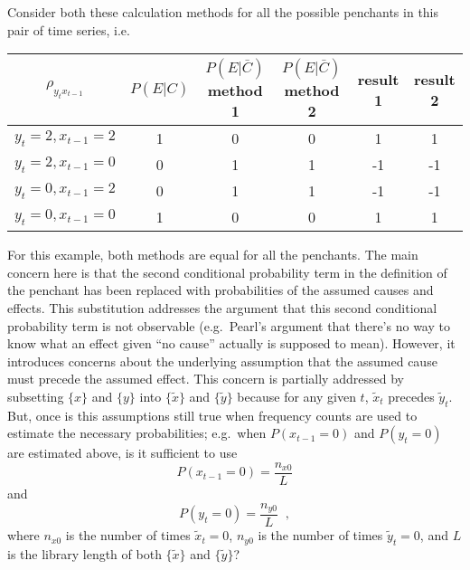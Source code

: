 \documentclass[a4paper,11pt]{article}
\begin{document}
Consider both these calculation methods for all the possible penchants in this pair of time series, i.e.\
\begin{center}
\begin{tabular}{c|c|c|c|c|c}
$\rho_{y_{t}x_{t-1}}$ & $P(E|C)$ & $P(E|\bar{C})$ method 1 & $P(E|\bar{C})$ method 2 & result 1 & result 2\\
\hline
 $y_{t}=2,x_{t-1}=2$& 1 & 0 & 0 & 1 & 1\\
 $y_{t}=2,x_{t-1}=0$& 0 & 1 & 1 & -1 & -1\\
 $y_{t}=0,x_{t-1}=2$& 0 & 1 & 1 & -1 & -1\\
 $y_{t}=0,x_{t-1}=0$& 1 & 0 & 0 & 1 & 1
\end{tabular}
\end{center}
For this example, both methods are equal for all the penchants.  The main concern here is that the second conditional probability term in the definition of the penchant has been replaced with probabilities of the assumed causes and effects.  This substitution addresses the argument that this second conditional probability term is not observable (e.g.\ Pearl's argument that there's no way to know what an effect given ``no cause'' actually is supposed to mean).  However, it introduces concerns about the underlying assumption that the assumed cause must precede the assumed effect.  This concern is partially addressed by subsetting $\{x\}$ and $\{y\}$ into $\{\tilde{x}\}$ and $\{\tilde{y}\}$ because for any given $t$, $\tilde{x}_t$ precedes $\tilde{y}_t$.  But, once is this assumptions still true when frequency counts are used to estimate the necessary probabilities; e.g.\ when $P(x_{t-1}=0)$ and $P(y_t=0)$ are estimated above, is it sufficient to use   
$$
P(x_{t-1}=0) = \frac{n_{x0}}{L}
$$ 
and 
$$
P(y_t=0) = \frac{n_{y0}}{L}\;\;,
$$
where $n_{x0}$ is the number of times $\tilde{x}_t = 0$, $n_{y0}$ is the number of times $\tilde{y}_t = 0$, and $L$ is the library length of both $\{\tilde{x}\}$ and $\{\tilde{y}\}$?
\end{document}
